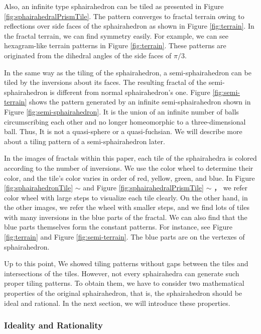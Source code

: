 \noindent
Also, an infinite type sphairahedron can be tiled as presented in Figure
\ref{fig:sphairahedralPrismTile}.
The pattern converges to fractal terrain owing to reflections over side
faces of the sphairahedron as shown in Figure \ref{fig:terrain}.
In the fractal terrain, we can find symmetry easily.
For example, we can see hexagram-like terrain patterns in Figure
\ref{fig:terrain}.
These patterns are originated from the dihedral angles of the side faces of
$\pi / 3$.

In the same way as the tiling of the sphairahedron, a semi-sphairahedron
can be tiled by the inversions about its faces.
The resulting fractal of the semi-sphairahedron is different from normal
sphairahedron's one.
Figure \ref{fig:semi-terrain} shows the pattern
generated by an infinite semi-sphairahedron shown in Figure 
\ref{fig:semi-sphairahedron}.
It is the union of an infinite number of balls
circumscribing each other and no longer homeomorphic
to a three-dimensional ball.
Thus, It is not a quasi-sphere or a quasi-fuchsian.
We will describe more about a tiling pattern of a semi-sphairahedron later.

In the images of fractals within this paper, each tile of the
sphairahedra is colored according to the
number of inversions.
We use the color wheel to determine their color,
and the tile's color varies in order of red, yellow, green, and blue.
In Figure \ref{fig:sphairahedronTile}  $\sim$
 and
Figure  \ref{fig:sphairahedralPrismTile} 
$\sim$ ，
we refer color wheel with large steps to visualize each tile clearly.
On the other hand, in the other images, we refer the wheel with smaller
steps, and we find lots of tiles with many inversions in the blue
parts of the fractal.
We can also find that the blue parts themselves form the constant
patterns.
For instance, see Figure \ref{fig:terrain} and Figure \ref{fig:semi-terrain}.
The blue parts are on the vertexes of sphairahedron.

Up to this point, We showed tiling patterns without gaps between the tiles and
intersections of the tiles.
However, not every sphairahedra can generate such proper tiling patterns.
To obtain them, we have to consider two mathematical properties
of the original sphairahedron, that is, the sphairahedron should be
ideal and rational.
In the next section, we will introduce these properties.

\subsubsection{Ideality and Rationality}

